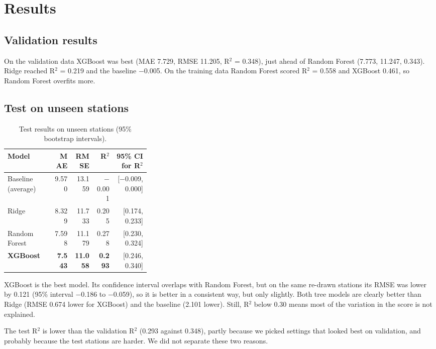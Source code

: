 \documentclass[conference]{IEEEtran}
\begin{document}
\section{Results}
\subsection{Validation results}
On the validation data XGBoost was best (MAE 7.729, RMSE 11.205, R$^2$ = 0.348), just ahead of Random Forest (7.773, 11.247, 0.343). Ridge reached R$^2$ = 0.219 and the baseline $-$0.005. On the training data Random Forest scored R$^2$ = 0.558 and XGBoost 0.461, so Random Forest overfits more.

\subsection{Test on unseen stations}
\begin{table}[!t]\caption{Test results on unseen stations (95\% bootstrap intervals).}\centering
{\footnotesize\setlength{\tabcolsep}{3pt}\begin{tabular}{>{\raggedright\arraybackslash}p{0.33\linewidth}rrrr}\toprule
\textbf{Model} & \textbf{MAE} & \textbf{RMSE} & \textbf{R$^2$} & \textbf{95\% CI for R$^2$}\\\midrule
Baseline (average) & 9.570 & 13.159 & $-$0.001 & [$-$0.009, 0.000]\\
Ridge & 8.329 & 11.733 & 0.205 & [0.174, 0.233]\\
Random Forest & 7.598 & 11.179 & 0.278 & [0.230, 0.324]\\
\textbf{XGBoost} & \textbf{7.543} & \textbf{11.058} & \textbf{0.293} & [0.246, 0.340]\\
\bottomrule\end{tabular}}
\end{table}

XGBoost is the best model. Its confidence interval overlaps with Random Forest, but on the same re-drawn stations its RMSE was lower by 0.121 (95\% interval $-$0.186 to $-$0.059), so it is better in a consistent way, but only slightly. Both tree models are clearly better than Ridge (RMSE 0.674 lower for XGBoost) and the baseline (2.101 lower). Still, R$^2$ below 0.30 means most of the variation in the score is not explained.

The test R$^2$ is lower than the validation R$^2$ (0.293 against 0.348), partly because we picked settings that looked best on validation, and probably because the test stations are harder. We did not separate these two reasons.
\end{document}
